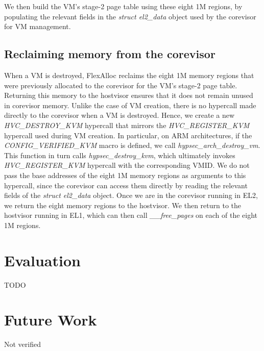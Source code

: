 We then build the VM's stage-2 page table using these eight 1M regions, by
populating the relevant fields in the \textit{struct el2\_data} object used
by the corevisor for VM management.

\subsection{Reclaiming memory from the corevisor}

When a VM is destroyed, FlexAlloc reclaims the eight 1M memory regions that were
previously allocated to the corevisor for the VM's stage-2 page table. Returning
this memory to the hostvisor ensures that it does not remain unused in corevisor
memory. Unlike the case of VM creation, there is no hypercall made directly to
the corevisor when a VM is destroyed. Hence, we create a new \textit{HVC\_DESTROY\_KVM}
hypercall that mirrors the \textit{HVC\_REGISTER\_KVM} hypercall used during VM
creation. In particular, on ARM architectures, if the \textit{CONFIG\_VERIFIED\_KVM} macro is defined,
we call \textit{hypsec\_arch\_destroy\_vm}. This function in turn calls \textit{hypsec\_destroy\_kvm},
which ultimately invokes \textit{HVC\_REGISTER\_KVM} hypercall with the corresponding
VMID. We do not pass the base addresses of the eight 1M memory regions as arguments
to this hypercall, since the corevisor can access them directly by reading the
relevant fields of the \textit{struct el2\_data} object. Once we are in the
corevisor running in EL2, we return the eight memory regions to the hostvisor.
We then return to the hostvisor running in EL1, which can then call \textit{\_\_free\_pages}
on each of the eight 1M regions.

\section{Evaluation}

TODO

\section{Future Work}

Not verified

